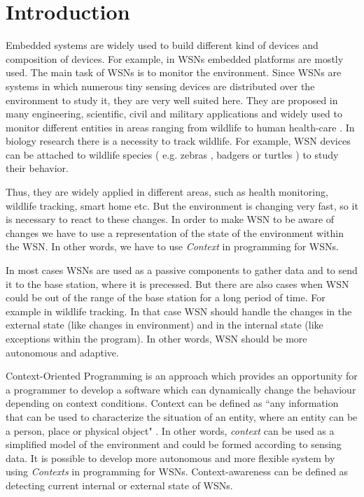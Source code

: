 \documentclass{ubicomp-ext}
\begin{document}
\section{Introduction}
Embedded systems are widely used to build different kind of devices and composition of devices. For example, in WSNs embedded platforms are mostly used. The main task of WSNs is to monitor the environment. Since WSNs are systems in which numerous tiny sensing devices are distributed over the environment to study it, they are very well suited here. They are proposed in many engineering, scientific,  civil and military applications and widely used to monitor different entities in areas ranging from wildlife \cite{juang02} \cite{lingren08} \cite{pastor08} to human health-care \cite{lorincz09} \cite{alemdar10}. In biology research there is a necessity to track wildlife. For example, WSN devices can be attached to wildlife species ( e.g. zebras \cite{juang02}, badgers \cite{dyo09} or turtles \cite{gorlick07}) to study their behavior.

 Thus, they are widely applied in different areas, such as health monitoring, wildlife tracking, smart home etc. But the environment is changing very fast, so it is necessary to react to these changes. In order to make WSN to be aware of changes we have to use a representation of the state of the environment within the WSN. In other words, we have to use \textit{Context} in programming for WSNs.

In most cases WSNs are used as a passive components to gather data and to send it to the base station, where it is precessed. But there are also cases when WSN could be out of the range of the base station for a long period of time. For example in wildlife tracking. In that case WSN should handle the changes in the external state (like changes in environment) and in the internal state (like exceptions within the program). In other words, WSN should be more autonomous and adaptive.

Context-Oriented Programming \cite{hirschfeld08} is an approach which provides an opportunity for a programmer to develop a software which can dynamically change the behaviour depending on context conditions. Context can be defined as ``any information that can be used to characterize the situation of an entity, where an entity can be a person, place or physical object" \cite{dey99}. In other words, \textit{context} can be used as a simplified model of the environment and could be formed according to sensing data. It is possible to develop more autonomous and more flexible system by using \textit{Contexts} in programming for WSNs. Context-awareness can be defined as detecting current internal or external state of WSNs.
\end{document}
